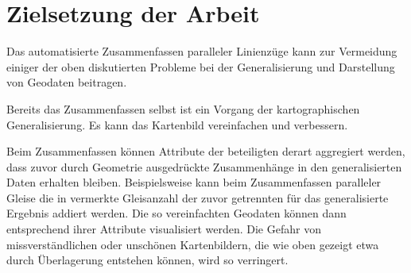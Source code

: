 \documentclass[../main/thesis.tex]{subfiles}
\begin{document}











\section{Zielsetzung der Arbeit}


Das automatisierte Zusammenfassen paralleler Linienzüge kann zur Vermeidung einiger der oben diskutierten Probleme bei der Generalisierung und Darstellung von Geodaten beitragen.

Bereits das Zusammenfassen selbst ist ein Vorgang der kartographischen Generalisierung. Es kann das Kartenbild vereinfachen und verbessern.

Beim Zusammenfassen können Attribute der beteiligten  derart aggregiert werden, dass zuvor durch Geometrie ausgedrückte Zusammenhänge in den generalisierten Daten erhalten bleiben. Beispielsweise kann beim Zusammenfassen paralleler Gleise die in  vermerkte Gleisanzahl der zuvor getrennten  für das generalisierte Ergebnis addiert werden. Die so vereinfachten Geodaten können dann entsprechend ihrer Attribute visualisiert werden. Die Gefahr von missverständlichen oder unschönen Kartenbildern, die wie oben gezeigt etwa durch Überlagerung entstehen können, wird so verringert.
\end{document}

